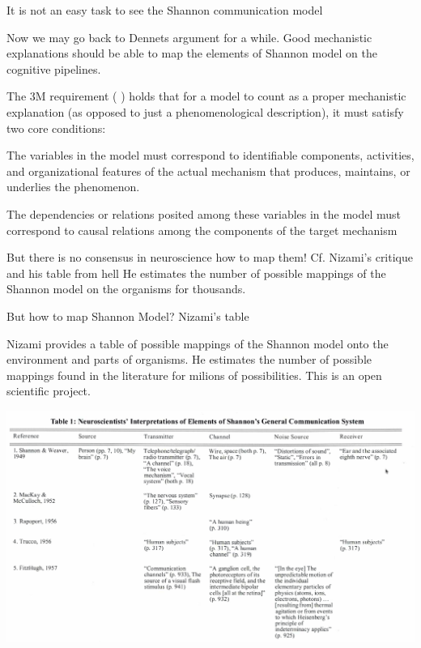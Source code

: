 \documentclass[10pt, aspectratio=169, handout]{beamer}
\begin{document}
    \begin{frame}[label=shannon_channel] {It is not an easy task to see the Shannon communication model }
    
        Now we may go back to Dennets argument for a while. Good mechanistic explanations should be able to map the elements of Shannon model on the cognitive pipelines. 
     
     The 3M requirement (\cite{kaplan_explanatory_2011-1} ) holds that for a model to count as a proper mechanistic explanation (as opposed to just a phenomenological description), it must satisfy two core conditions:
     
     The variables in the model must correspond to identifiable components, activities, and organizational features of the actual mechanism that produces, maintains, or underlies the phenomenon.
     
     The dependencies or relations posited among these variables in the model must correspond to causal relations among the components of the target mechanism
     
     But there is no consensus in neuroscience how to map them!   Cf.  Nizami's critique and his table from hell \cite{nizami_information_2019}
     He estimates the number of possible mappings of the Shannon model on the organisms for thousands. 
     
     
     \end{frame}

\begin{frame}[label=nizami_table]  {But how to map Shannon Model? Nizami's table} 
   
  Nizami provides a table of possible mappings of the Shannon model onto the environment and parts of organisms. He estimates the number of possible mappings found in the literature for milions of possibilities. This is an open scientific project.
        \begin{center}
            \includegraphics[width=1\textwidth]{images/Nizami_table1.png}
        \end{center}

\end{frame}
\end{document}
